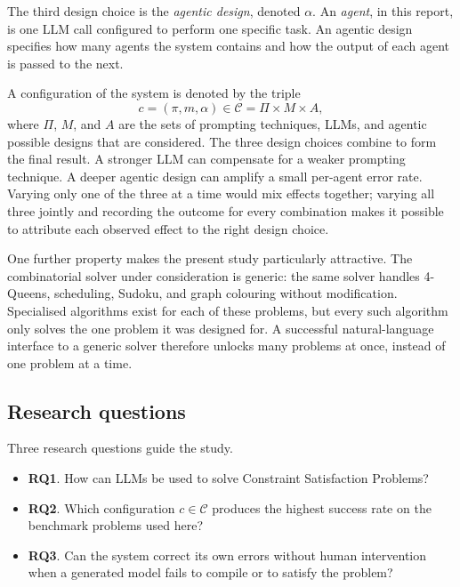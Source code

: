 \documentclass[11pt,a4paper]{article}
\newcommand{\rqone}{\textbf{RQ1}}
\newcommand{\rqtwo}{\textbf{RQ2}}
\newcommand{\rqthree}{\textbf{RQ3}}
\begin{document}
The third design choice is the \emph{agentic design}, denoted $\alpha$. An \emph{agent}, in this report, is one LLM call configured to perform one specific task. An agentic design specifies how many agents the system contains and how the output of each agent is passed to the next.

A configuration of the system is denoted by the triple
\[
c = (\pi, m, \alpha) \in \mathcal{C} = \Pi \times M \times A,
\]
where $\Pi$, $M$, and $A$ are the sets of prompting techniques, LLMs, and agentic possible designs that are considered. The three design choices combine to form the final result. A stronger LLM can compensate for a weaker prompting technique. A deeper agentic design can amplify a small per-agent error rate. Varying only one of the three at a time would mix effects together; varying all three jointly and recording the outcome for every combination makes it possible to attribute each observed effect to the right design choice.

One further property makes the present study particularly attractive. The combinatorial solver under consideration is generic: the same solver handles 4-Queens, scheduling, Sudoku, and graph colouring without modification. Specialised algorithms exist for each of these problems, but every such algorithm only solves the one problem it was designed for. A successful natural-language interface to a generic solver therefore unlocks many problems at once, instead of one problem at a time.

\subsection{Research questions}\label{sec:intro:rq}
Three research questions guide the study.
\begin{itemize}[leftmargin=1.4em,topsep=2pt,itemsep=1pt]
  \item \rqone{}. How can LLMs be used to solve Constraint Satisfaction Problems?
  \item \rqtwo{}. Which configuration $c \in \mathcal{C}$ produces the highest success rate on the benchmark problems used here?
  \item \rqthree{}. Can the system correct its own errors without human intervention when a generated model fails to compile or to satisfy the problem?
\end{itemize}
\end{document}
